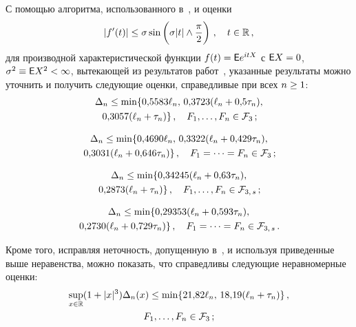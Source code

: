 \begin{multicols}{2}
С помощью алгоритма, использованного в~\cite{Shevtsova2012ISSPSM3},
и оценки
$$
|f'(t)|\le \sigma\sin\left(\sigma|t| \wedge\displaystyle\frac{\displaystyle \pi\mathstrut}{\displaystyle 2\mathstrut}\right)\,,\quad t\in\mathbb R\,,
$$
для производной характеристической функции $f(t)\hm=\e e^{itX}$ с $\e
X\hm=0$, $\sigma^2\hm\equiv\e X^2\hm<\infty$, вытекающей из результатов
работ~\cite{Rossberg1991, MatysiakSzablowski2001}, указанные
результаты можно уточнить и получить следующие оценки, справедливые
при всех $n\hm\ge1$:
\begin{multline*}
\Delta_n\le \min\{0{,}5583\ell_n,\, 0{,}3723(\ell_n+0{,}5\tau_n),\\
\,0{,}3057(\ell_n+\tau_n)\}\,,\quad F_1,\ldots,F_n\in{\mathcal F}_3\,;
\end{multline*}

\vspace*{-12pt}

\noindent
\begin{multline*}
\Delta_n\le \min\{0{,}4690\ell_n,\, 0{,}3322(\ell_n+0{,}429\tau_n),\\
\,0{,}3031(\ell_n+0{,}646\tau_n)\}\,,\quad F_1=\cdots=F_n\in{\mathcal F}_3\,;
\end{multline*}

\vspace*{-12pt}

\noindent
\begin{multline*}
\Delta_n\le \min\{ 0{,}34245(\ell_n+0{,}63\tau_n),\\
\,0{,}2873(\ell_n+\tau_n)\}\,,\quad F_1,\ldots,F_n\in{\mathcal F}_{3,\,s}\,;
\end{multline*}

\vspace*{-12pt}

\noindent
\begin{multline*}
\Delta_n\le \min\{ 0{,}29353(\ell_n+0{,}593\tau_n),\\
\,0{,}2730(\ell_n+0{,}729\tau_n)\}\,,\quad F_1=\cdots=F_n\in{\mathcal F}_{3,\,s}\,.
\end{multline*}

Кроме того, исправляя неточность, допущенную
в~\cite{NefedovaShevtsova2012}, и используя приведенные выше
неравенства, можно показать, что справедливы следующие неравномерные
оценки:
\begin{multline*}
\sup\limits_{x\in\mathbb R}(1+|x|^3)\Delta_n(x)\le \min\{21{,}82\ell_n,\,
18{,}19(\ell_n+\tau_n)\}\,,\\ F_1,\ldots,F_n\in{\mathcal F}_3\,;
\end{multline*}

\vspace*{-12pt}


\end{multicols}
